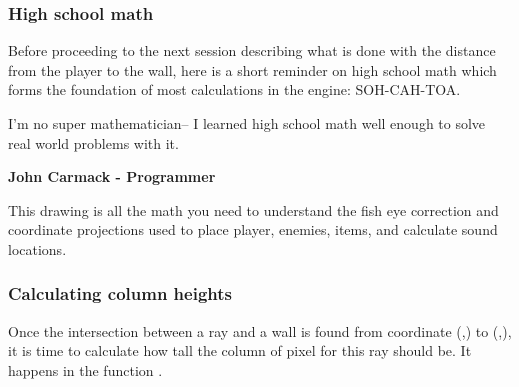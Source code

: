 \subsubsection{High school math}
Before proceeding to the next session describing what is done with the distance from the player to the wall, here is a short reminder on high school math which forms the foundation of most calculations in the engine: SOH-CAH-TOA.\\
\par
 \begin{fancyquotes}
  I'm no super mathematician-- I learned high school math well enough to solve real world problems with it.\\
 \par
\textbf{John Carmack - Programmer}
 \end{fancyquotes}


\par
\begin{figure}[H]
\centering
 
\end{figure}



This drawing is all the math you need to understand the fish eye correction and coordinate projections used to place player, enemies, items, and calculate sound locations.\\






\subsubsection{Calculating column heights}
Once the intersection between a ray and a wall is found from coordinate (,) to (,), it is time to calculate how tall the column of pixel for this ray should be. It happens in the function .\\

\begin{minipage}{\textwidth}

\end{minipage}

